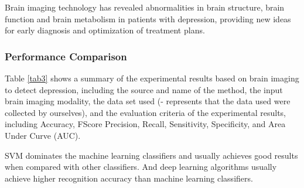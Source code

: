 Brain imaging technology has revealed abnormalities in brain structure, brain function and brain metabolism in patients with depression, providing new ideas for early diagnosis and optimization of treatment plans.

\subsubsection{Performance Comparison}
Table \ref{tab3} shows a summary of the experimental results based on brain imaging to detect depression, including the source and name of the method, the input brain imaging modality, the data set used (- represents that the data used were collected by ourselves), and the evaluation criteria of the experimental results, including Accuracy, FScore Precision, Recall, Sensitivity, Specificity, and Area Under Curve (AUC).

SVM dominates the machine learning classifiers and usually achieves good results when compared with other classifiers. And deep learning algorithms usually achieve higher recognition accuracy than machine learning classifiers.

